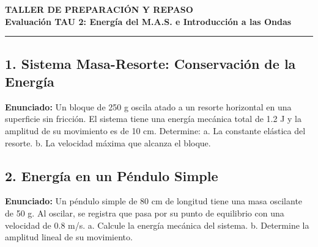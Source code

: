 \documentclass[12pt, letterpaper]{article}
\begin{document}
\newpage
\begin{center}
	{\LARGE \textbf{TALLER DE PREPARACIÓN Y REPASO}}\\[0.2cm]
	{\Large \textbf{Evaluación TAU 2: Energía del M.A.S. e Introducción a las Ondas}}\\[0.1cm]
	\hrule
\end{center}

\vspace{0.5cm}

\subsection*{1. Sistema Masa-Resorte: Conservación de la Energía}
\noindent \textbf{Enunciado:} Un bloque de 250 g oscila atado a un resorte horizontal en una superficie sin fricción. El sistema tiene una energía mecánica total de 1.2 J y la amplitud de su movimiento es de 10 cm. Determine: a. La constante elástica del resorte. b. La velocidad máxima que alcanza el bloque.


\subsection*{2. Energía en un Péndulo Simple}
\noindent \textbf{Enunciado:} Un péndulo simple de 80 cm de longitud tiene una masa oscilante de 50 g. Al oscilar, se registra que pasa por su punto de equilibrio con una velocidad de 0.8 m/s. a. Calcule la energía mecánica del sistema. b. Determine la amplitud lineal de su movimiento.
\end{document}
